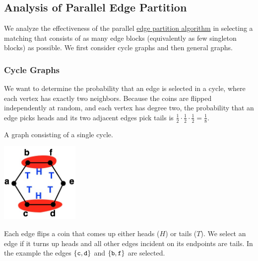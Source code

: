 \subsection{Analysis of Parallel Edge Partition}
\label{sec:edge::partition::analysis}

\begin{gram}
We analyze the effectiveness of the parallel 
%
\href{alg:graphcon::edge::parallel-matching}{edge partition algorithm}
%
in selecting a matching that consists of as many edge blocks
(equivalently as few singleton blocks) as possible.
%
We first consider cycle graphs and then general graphs.

\end{gram}

\subsubsection{Cycle Graphs}
\label{sec:edge::partition::analysis::cycle}

\begin{gram}
\label{graphcon::edge::analysis::cycle::pr}
We want to determine the probability that an edge is selected in a
cycle, where each vertex has exactly two neighbors. 
%
Because the coins are flipped independently at random, and each vertex
has degree two, the probability that an edge picks heads and its two
adjacent edges pick tails is $\frac{1}{2} \cdot \frac{1}{2} \cdot
\frac{1}{2} = \frac{1}{8}$.
\end{gram}

\begin{example} 
\label{ex:graphcon::edge::analysis::cycle::1}
A graph consisting of a single cycle.    
  \begin{center}
  \includegraphics[width=1.5in]{./graph-contraction/media-edge/cycle-graph.jpg}
  \end{center}
Each edge flips a coin that comes up either heads ($H$) or tails
($T$).  
%
We select an edge if it turns up heads and all other edges
incident on its endpoints are tails.  In the example the edges
$\left\{ \texttt{c},\texttt{d} \right\}$ and $\left\{ \texttt{b},\texttt{f} \right\}$ are
selected.
\end{example}


